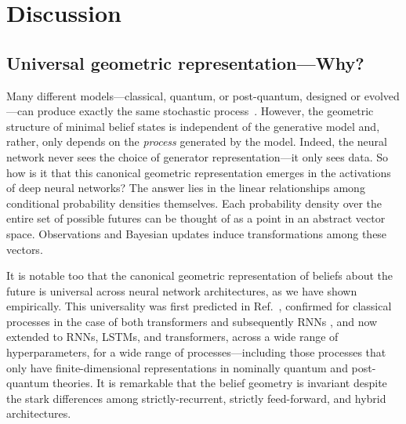 \documentclass[prx,nofootinbib,onecolumn,showkeys,groupaddress,preprintnumbers,floatfix,
superscriptaddress]{revtex4-1}
\begin{document}





 





\section{Discussion}



\subsection{Universal geometric representation---Why?}


Many different models---classical, quantum, or post-quantum, designed or evolved---can produce exactly the same stochastic process~\cite{Crut10a}.
However,
the geometric structure of minimal belief states is 
independent of the %
generative model
and, rather, only depends on the \emph{process} generated by the model. %
Indeed, the neural network never sees the choice of generator representation---it only sees data.  So how is it that this canonical geometric representation emerges in the activations of deep neural networks?
The answer lies in the linear relationships among conditional probability densities themselves.
Each probability density over the entire set of possible futures can be thought of as a point in an abstract vector space.
Observations and Bayesian updates induce transformations among these vectors.

It is notable too that the canonical geometric representation of beliefs about the future is universal across neural network architectures, as we have shown empirically.  This universality was first predicted in Ref.~\cite{Shai24_Transformers},  confirmed for classical processes in the case of both transformers \cite{Shai24_Transformers} and subsequently RNNs \cite{Pepper24_RNNs},
and now extended to RNNs, LSTMs, and transformers, across a wide range of hyperparameters, for a wide range of processes---including those processes that only have finite-dimensional representations in nominally quantum and post-quantum theories.
It is remarkable that the belief geometry is invariant %
despite
the stark differences among strictly-recurrent, strictly feed-forward, and hybrid architectures.
\end{document}
